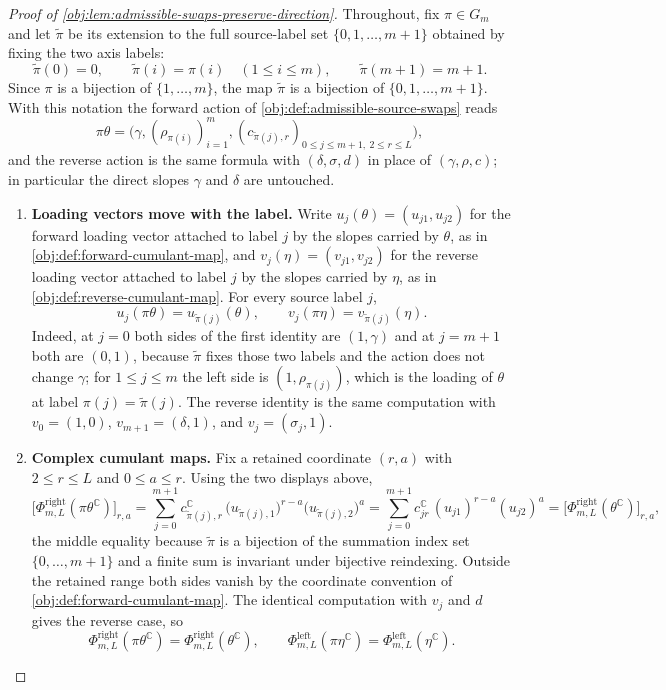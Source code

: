 \begin{proof}[Proof of \cref{obj:lem:admissible-swaps-preserve-direction}]
Throughout, fix \(\pi\in G_m\) and let \(\tilde\pi\) be its extension to the full source-label set \(\{0,1,\ldots,m+1\}\) obtained by fixing the two axis labels:
\[
\tilde\pi(0)=0,
\qquad
\tilde\pi(i)=\pi(i)\quad(1\le i\le m),
\qquad
\tilde\pi(m+1)=m+1 .
\]
Since \(\pi\) is a bijection of \(\{1,\ldots,m\}\), the map \(\tilde\pi\) is a bijection of \(\{0,1,\ldots,m+1\}\).  With this notation the forward action of \cref{obj:def:admissible-source-swaps} reads
\[
\pi\theta=\bigl(\gamma,(\rho_{\pi(i)})_{i=1}^m,(c_{\tilde\pi(j),r})_{0\le j\le m+1,\ 2\le r\le L}\bigr),
\]
and the reverse action is the same formula with \((\delta,\sigma,d)\) in place of \((\gamma,\rho,c)\); in particular the direct slopes \(\gamma\) and \(\delta\) are untouched.

\begin{enumerate}
\item \textbf{Loading vectors move with the label.}  Write \(u_j(\theta)=(u_{j1},u_{j2})\) for the forward loading vector attached to label \(j\) by the slopes carried by \(\theta\), as in \cref{obj:def:forward-cumulant-map}, and \(v_j(\eta)=(v_{j1},v_{j2})\) for the reverse loading vector attached to label \(j\) by the slopes carried by \(\eta\), as in \cref{obj:def:reverse-cumulant-map}.  For every source label \(j\),
\[
u_j(\pi\theta)=u_{\tilde\pi(j)}(\theta),
\qquad
v_j(\pi\eta)=v_{\tilde\pi(j)}(\eta).
\]
Indeed, at \(j=0\) both sides of the first identity are \((1,\gamma)\) and at \(j=m+1\) both are \((0,1)\), because \(\tilde\pi\) fixes those two labels and the action does not change \(\gamma\); for \(1\le j\le m\) the left side is \((1,\rho_{\pi(j)})\), which is the loading of \(\theta\) at label \(\pi(j)=\tilde\pi(j)\).  The reverse identity is the same computation with \(v_0=(1,0)\), \(v_{m+1}=(\delta,1)\), and \(v_j=(\sigma_j,1)\).

\item \textbf{Complex cumulant maps.}  Fix a retained coordinate \((r,a)\) with \(2\le r\le L\) and \(0\le a\le r\).  Using the two displays above,
\[
\bigl[\Phi^{\mathrm{right}}_{m,L}(\pi\theta^{\mathbb C})\bigr]_{r,a}
=\sum_{j=0}^{m+1} c^{\mathbb C}_{\tilde\pi(j),r}\,
   \bigl(u_{\tilde\pi(j),1}\bigr)^{r-a}\bigl(u_{\tilde\pi(j),2}\bigr)^{a}
=\sum_{j=0}^{m+1} c^{\mathbb C}_{jr}\,(u_{j1})^{r-a}(u_{j2})^{a}
=\bigl[\Phi^{\mathrm{right}}_{m,L}(\theta^{\mathbb C})\bigr]_{r,a},
\]
the middle equality because \(\tilde\pi\) is a bijection of the summation index set \(\{0,\ldots,m+1\}\) and a finite sum is invariant under bijective reindexing.  Outside the retained range both sides vanish by the coordinate convention of \cref{obj:def:forward-cumulant-map}.  The identical computation with \(v_j\) and \(d\) gives the reverse case, so
\[
\Phi^{\mathrm{right}}_{m,L}(\pi\theta^{\mathbb C})=\Phi^{\mathrm{right}}_{m,L}(\theta^{\mathbb C}),
\qquad
\Phi^{\mathrm{left}}_{m,L}(\pi\eta^{\mathbb C})=\Phi^{\mathrm{left}}_{m,L}(\eta^{\mathbb C}).
\]


\end{enumerate}
\end{proof}
